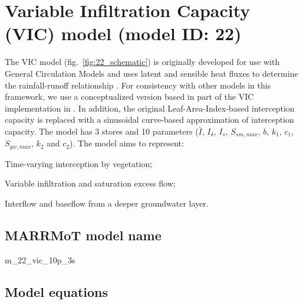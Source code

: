 \section{Variable Infiltration Capacity (VIC) model (model ID: 22)}
The VIC model (fig.~\ref{fig:22_schematic}) is originally developed for use with General Circulation Models and uses latent and sensible heat fluxes to determine the rainfall-runoff relationship \citep{Liang1994}. For consistency with other models in this framework, we use a conceptualized version based in part of the VIC implementation in \citet{Clark2008a}. In addition, the original Leaf-Area-Index-based interception capacity is replaced with a sinusoidal curve-based approximation of interception capacity. The model has 3 stores and 10 parameters ($\bar{I}$, $I_{\delta}$, $I_s$, $S_{sm,max}$, $b$, $k_1$, $c_1$, $S_{gw,max}$, $k_2$ and $c_2$). The model aims to represent:

\begin{itemizecompact}
\item Time-varying interception by vegetation;
\item Variable infiltration and saturation excess flow;
\item Interflow and baseflow from a deeper groundwater layer.
\end{itemizecompact}

\subsection{MARRMoT model name}
m\_22\_vic\_10p\_3s \\

\subsection{Model equations}

